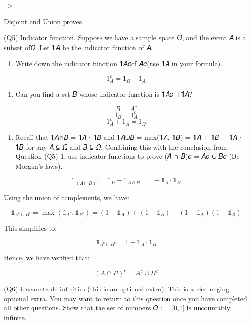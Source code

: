 \documentclass[
]{article}
\providecommand{\tightlist}{%
  \setlength{\itemsep}{0pt}\setlength{\parskip}{0pt}}
\begin{document}
--\textgreater{}

Disjoint and Union proves

(Q5) Indicator function. Suppose we have a sample space 𝛺, and the event
𝐴 is a subset of𝛺. Let 𝟏𝐴 be the indicator function of 𝐴.

\begin{enumerate}
\def\labelenumi{\arabic{enumi}.}
\tightlist
\item
  Write down the indicator function 𝟏𝐴𝑐of 𝐴𝑐(use 𝟏𝐴 in your formula).
\end{enumerate}

\[
1_A^c = 1_Ω - 1_A
\]

\begin{enumerate}
\def\labelenumi{\arabic{enumi}.}
\setcounter{enumi}{1}
\tightlist
\item
  Can you find a set 𝐵 whose indicator function is 𝟏𝐴𝑐 +𝟏𝐴?
\end{enumerate}

\[
B = A^c
\] \[
1_B = 1_A^c
\] \[
1_A^c + 1_A = 1_Ω 
\]

\begin{enumerate}
\def\labelenumi{\arabic{enumi}.}
\setcounter{enumi}{2}
\tightlist
\item
  Recall that 𝟏𝐴∩𝐵 = 𝟏𝐴 ⋅ 𝟏𝐵 and 𝟏𝐴∪𝐵 = max(𝟏𝐴, 𝟏𝐵) = 𝟏𝐴 + 𝟏𝐵 − 𝟏𝐴 ⋅ 𝟏𝐵
  for any 𝐴 ⊆ 𝛺 and 𝐵 ⊆ 𝛺. Combining this with the conclusion from
  Question (Q5) 1, use indicator functions to prove (𝐴 ∩ 𝐵)𝑐 = 𝐴𝑐 ∪ 𝐵𝑐
  (De Morgan's laws).
\end{enumerate}

\[
\mathbb{1}_{(A \cap B)^c} = \mathbb{1}_{\Omega} - \mathbb{1}_{A \cap B} = 1 - \mathbb{1}_{A} \cdot \mathbb{1}_{B}
\]

Using the union of complements, we have:

\[
\mathbb{1}_{A^c \cup B^c} = \max(\mathbb{1}_{A^c}, \mathbb{1}_{B^c}) = (1 - \mathbb{1}_{A}) + (1 - \mathbb{1}_{B}) - (1 - \mathbb{1}_{A})(1 - \mathbb{1}_{B})
\]

This simplifies to:

\[
\mathbb{1}_{A^c \cup B^c} = 1 - \mathbb{1}_{A} \cdot \mathbb{1}_{B}
\]

Hence, we have verified that:

\[
(A \cap B)^c = A^c \cup B^c
\]

(Q6) Uncountable infinities (this is an optional extra). This is a
challenging optional extra. You may want to return to this question once
you have completed all other questions. Show that the set of numbers 𝛺 :
= {[}0,1{]} is uncountably infinite.
\end{document}

